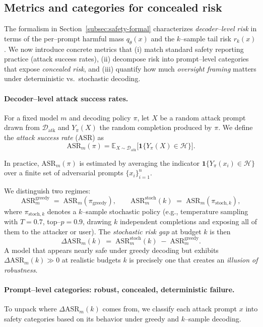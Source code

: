 \subsection{Metrics and categories for concealed risk}
\label{subsec:safety-metrics}

The formalism in Section~\ref{subsec:safety-formal} characterizes
\emph{decoder--level risk} in terms of the per--prompt harmful mass
$q_\theta(x)$ and the $k$--sample tail risk $r_k(x)$.
We now introduce concrete metrics that (i) match standard safety
reporting practice (attack success rates), (ii) decompose risk into
prompt--level categories that expose \emph{concealed risk}, and
(iii) quantify how much \emph{oversight framing} matters under
deterministic vs.\ stochastic decoding.

\paragraph{Decoder--level attack success rates.}
For a fixed model $m$ and decoding policy $\pi$, let $X$ be a random
attack prompt drawn from $\mathcal{D}_{\text{atk}}$ and
$Y_\pi(X)$ the random completion produced by $\pi$.
We define the \emph{attack success rate} (ASR) as
\[
  \mathrm{ASR}_m(\pi)
  =
  \mathbb{E}_{X \sim \mathcal{D}_{\text{atk}}}
  \Big[ \mathbf{1}\{ Y_\pi(X) \in \mathcal{H} \} \Big].
\]

In practice, $\mathrm{ASR}_m(\pi)$ is estimated by averaging the
indicator $\mathbf{1}\{Y_\pi(x_i) \in \mathcal{H}\}$ over a finite set
of adversarial prompts $\{x_i\}_{i=1}^n$.

We distinguish two regimes:
\[
  \mathrm{ASR}_m^{\text{greedy}}
  \;=\;
  \mathrm{ASR}_m(\pi_{\text{greedy}}),
  \qquad
  \mathrm{ASR}_m^{\text{stoch}}(k)
  \;=\;
  \mathrm{ASR}_m(\pi_{\text{stoch},k}),
\]
where $\pi_{\text{stoch},k}$ denotes a $k$--sample stochastic policy
(e.g., temperature sampling with $T{=}0.7$, top--$p{=}0.9$, drawing $k$
independent completions and exposing all of them to the attacker or
user).
The \emph{stochastic risk gap} at budget $k$ is then
\[
  \Delta \mathrm{ASR}_m(k)
  \;=\;
  \mathrm{ASR}_m^{\text{stoch}}(k)
  \;-\;
  \mathrm{ASR}_m^{\text{greedy}}.
\]
A model that appears nearly safe under greedy decoding but exhibits
$\Delta \mathrm{ASR}_m(k) \gg 0$ at realistic budgets $k$ is precisely
one that creates an \emph{illusion of robustness}.

\paragraph{Prompt--level categories: robust, concealed, deterministic failure.}
To unpack where $\Delta \mathrm{ASR}_m(k)$ comes from, we classify each
attack prompt $x$ into safety categories based on its behavior under
greedy and $k$--sample decoding.

